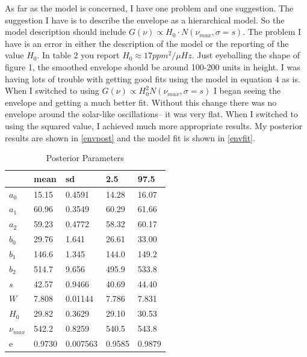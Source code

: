 \documentclass[10pt,a4paper]{article}
\begin{document}
		As far as the model is concerned, I have one problem and one suggestion. The suggestion I have is to describe the envelope as a hierarchical model. So the model description should include $G(\nu)\propto H_0 \cdot N(\nu_{max}, \sigma=s)$. The problem I have is an error in either the description of the model or the reporting of the value $H_0$. In table 2 you report $H_0\approx 17 ppm^2/\mu Hz$. Just eyeballing the shape of figure 1, the smoothed envelope should be around 100-200 units in height. I was having lots of trouble with getting good fits using the model in equation 4 as is. When I switched to using $ G(\nu) \propto H_0^2 N(\nu_{max}, \sigma=s)$ I began seeing the envelope and getting a much better fit. Without this change there was no envelope around the solar-like oscillations-- it was very flat. When I switched to using the squared value, I achieved much more appropriate results.	My posterior results are shown in \autoref{envpost} and the model fit is shown in \autoref{envfit}.
		\begin{table}
			\centering
			\caption{Posterior Parameters}
			\label{envpost}
			\begin{tabular}[\linewidth]{lllll}
				\hline
				            & mean   & sd       & 2.5    & 97.5   \\ \hline\hline
				$a_0$       & 15.15  & 0.4591   & 14.28  & 16.07  \\ 
				$a_1$       & 60.96  & 0.3549   & 60.29  & 61.66  \\ 
				$a_2$       & 59.23  & 0.4772   & 58.32  & 60.17  \\ 
				$b_0$       & 29.76  & 1.641    & 26.61  & 33.00  \\ 
				$b_1$       & 146.6  & 1.345    & 144.0  & 149.2  \\ 
				$b_2$       & 514.7  & 9.656    & 495.9  & 533.8  \\ 
				$s$         & 42.57  & 0.9466   & 40.69  & 44.40  \\ 
				$W$         & 7.808  & 0.01144  & 7.786  & 7.831  \\ 
				$H_0$       & 29.82  & 0.3629   & 29.10  & 30.53  \\ 
				$\nu_{max}$ & 542.2  & 0.8259   & 540.5  & 543.8  \\ 
				e           & 0.9730 & 0.007563 & 0.9585 & 0.9879 \\ 
			\end{tabular}
		\end{table}
	
\end{document}
